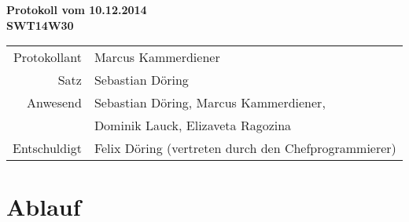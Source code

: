 \documentclass{scrartcl}
\begin{document}
\begin{center}
\LARGE \bf{Protokoll vom 10.12.2014 \\
SWT14W30}
\end{center}

\begin{tabular}{rp{10cm}}
Protokollant & Marcus Kammerdiener \\
Satz & Sebastian Döring \\
Anwesend & Sebastian Döring, Marcus Kammerdiener,\\
& Dominik Lauck, Elizaveta Ragozina \\
Entschuldigt & Felix Döring (vertreten durch den Chefprogrammierer)
\end{tabular}

\vspace*{3em}

\section{Ablauf}
\end{document}

